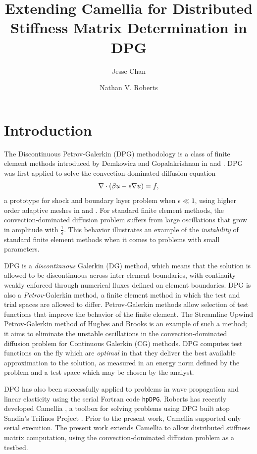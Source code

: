 \documentclass{article}
\date{}
\author{Jesse Chan \and Nathan V. Roberts}
\title{Extending Camellia for Distributed Stiffness Matrix Determination in DPG}
\begin{document}
\maketitle

\section{Introduction}

The Discontinuous Petrov-Galerkin (DPG) methodology is a class of finite element methods introduced by Demkowicz and Gopalakrishnan in \cite{DPG1} and \cite{DPG2}. DPG was first applied to solve the convection-dominated diffusion equation
\[
\div \left(\beta u - \epsilon\grad u\right) = f,
\]
a prototype for shock and boundary layer problem when $\epsilon \ll 1$, using higher order adaptive meshes in \cite{DPG2} and \cite{DPG3}. For standard finite element methods, the convection-dominated diffusion problem suffers from large oscillations that grow in amplitude with $\frac{1}{\epsilon}$. This behavior illustrates an example of the \emph{instability} of standard finite element methods when it comes to problems with small parameters.
 
DPG is a \emph{discontinuous} Galerkin (DG) method, which means that the solution is allowed to be discontinuous across inter-element boundaries, with continuity weakly enforced through numerical fluxes defined on element boundaries. DPG is also a \emph{Petrov}-Galerkin method, a finite element method in which the test and trial spaces are allowed to differ. Petrov-Galerkin methods allow selection of test functions that improve the behavior of the finite element. The Streamline Upwind Petrov-Galerkin method of Hughes and Brooks \cite{SUPG} is an example of such a method; it aims to eliminate the unstable oscillations in the convection-dominated diffusion problem for Continuous Galerkin (CG) methods.  DPG computes test functions on the fly which are \emph{optimal} in that they deliver the best available approximation to the solution, as measured in an energy norm defined by the problem and a test space which may be chosen by the analyst.

DPG has also been successfully applied to problems in wave propagation and linear elasticity \cite{DPG4,DPGElas} using the serial Fortran code \verb+hpDPG+.  Roberts has recently developed Camellia \cite{Camellia}, a toolbox for solving problems using DPG built atop Sandia's Trilinos Project \cite{Trilinos-Overview}.  Prior to the present work, Camellia supported only serial execution.  The present work extends Camellia to allow distributed stiffness matrix computation, using the convection-dominated diffusion problem as a testbed. 
\end{document}
